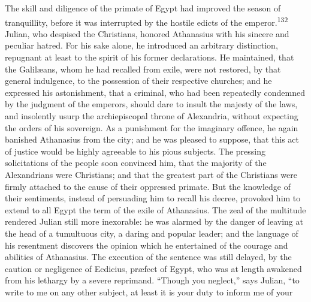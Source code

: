 

The skill and diligence of the primate of Egypt had improved the
season of tranquillity, before it was interrupted by the hostile
edicts of the emperor.\textsuperscript{132} Julian, who despised the Christians,
honored Athanasius with his sincere and peculiar hatred. For his
sake alone, he introduced an arbitrary distinction, repugnant at
least to the spirit of his former declarations. He maintained,
that the Galilæans, whom he had recalled from exile, were not
restored, by that general indulgence, to the possession of their
respective churches; and he expressed his astonishment, that a
criminal, who had been repeatedly condemned by the judgment of
the emperors, should dare to insult the majesty of the laws, and
insolently usurp the archiepiscopal throne of Alexandria, without
expecting the orders of his sovereign. As a punishment for the
imaginary offence, he again banished Athanasius from the city;
and he was pleased to suppose, that this act of justice would be
highly agreeable to his pious subjects. The pressing
solicitations of the people soon convinced him, that the majority
of the Alexandrians were Christians; and that the greatest part
of the Christians were firmly attached to the cause of their
oppressed primate. But the knowledge of their sentiments, instead
of persuading him to recall his decree, provoked him to extend to
all Egypt the term of the exile of Athanasius. The zeal of the
multitude rendered Julian still more inexorable: he was alarmed
by the danger of leaving at the head of a tumultuous city, a
daring and popular leader; and the language of his resentment
discovers the opinion which he entertained of the courage and
abilities of Athanasius. The execution of the sentence was still
delayed, by the caution or negligence of Ecdicius, præfect of
Egypt, who was at length awakened from his lethargy by a severe
reprimand. “Though you neglect,” says Julian, “to write to me on
any other subject, at least it is your duty to inform me of your
